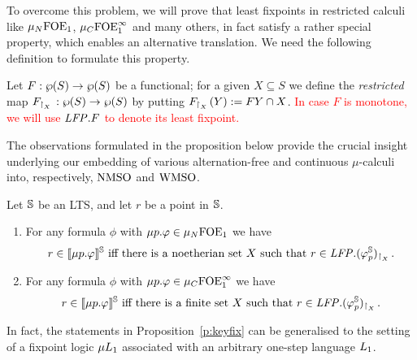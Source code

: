 To overcome this problem, we will prove that least fixpoints in restricted 
calculi like $\mu_{N}\mathrm{FOE}_1$, $\mu_{C}\mathrm{FOE}^{\infty}_1$ and many others, in fact satisfy a
rather special property, which enables an alternative translation.
We need the following definition to formulate this property.

\begin{definition}
\label{d:rst}
Let $F: \wp(S)\to \wp(S)$ be a functional; for a given $X \subseteq S$ we define
the \emph{restricted} map $F_{{\upharpoonright}_{X}\,}: \wp(S)\to \wp(S)$ by putting 
$F_{{\upharpoonright}_{X}\,}(Y) \mathrel{:=} FY \cap X$.
\textcolor{red}{
In case $F$ is monotone, we will use $\mathit{LFP}.F$ to denote its least fixpoint.
} 
\end{definition}


The observations formulated in the proposition below provide the crucial insight
underlying our embedding of various alternation-free and continuous 
$\mu$-calculi into, respectively, $\mathrm{NMSO}$ and $\mathrm{WMSO}$. 

\begin{proposition}
\label{p:afmc-rstGen}
\label{p:keyfix}
Let $\mathbb{S}$ be an LTS, and let $r$ be a point in $\mathbb{S}$.
\begin{enumerate}[(1)]
\item
 For any formula $\phi$ with $\mu p. \varphi \in \mu_{N}\mathrm{FOE}_1$ we have
\begin{equation}
\label{eq:foe-d}
r \in \llbracket\mu p.\varphi\rrbracket^{\mathbb{S}} \text{ iff there is a noetherian set $X$ such 
that } r \in \mathit{LFP}. (\varphi^{\mathbb{S}}_{p})_{{\upharpoonright}_{X}\,}.
\end{equation}

\item
For any formula $\phi$ with $\mu p. \varphi \in \mu_{C}\mathrm{FOE}^{\infty}_1$ we have
\begin{equation}
\label{eq:foei-c}
r \in \llbracket\mu p.\varphi\rrbracket^{\mathbb{S}} \text{ iff there is a finite set $X$ such 
that } r \in \mathit{LFP}. (\varphi^{\mathbb{S}}_{p})_{{\upharpoonright}_{X}\,}.
\end{equation}
\end{enumerate}
\end{proposition}

\begin{remark}
In fact, the statements in Proposition~\ref{p:keyfix} can be generalised to the
setting of a fixpoint logic $\mu L_{1}$ associated with an arbitrary one-step 
language $L_{1}$.
\end{remark}


